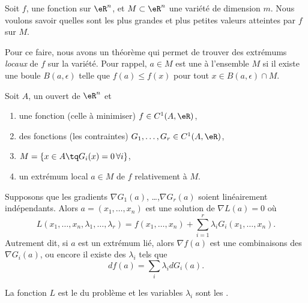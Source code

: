 Soit $f$, une fonction sur $\eR^n$, et $M\subset \eR^n$ une variété de dimension $m$. Nous voulons savoir quelles sont les plus grandes et plus petites valeurs atteintes par $f$ sur $M$.

Pour ce faire, nous avons un théorème qui permet de trouver des extrémums \emph{locaux} de $f$ sur la variété. Pour rappel, $a\in M$ est une  à l'ensemble $M$ si il existe une boule $B(a,\epsilon)$ telle que $f(a)\leq f(x)$ pour tout $x\in B(a,\epsilon)\cap M$.

\begin{theorem} \label{ThoRGJosS}
    Soit \( A\), un ouvert de \( \eR^n\) et
    \begin{enumerate}
        \item
            une fonction (celle à minimiser) $f\in C^1(A,\eR)$,
        \item
            des fonctions (les contraintes) $G_1,\ldots,G_r\in C^1(A,\eR)$,
        \item
            $M=\{ x\in A\tq G_i(x)=0\,\forall i\}$,
        \item
            un extrémum local $a\in M$ de $f$ relativement à $M$.
    \end{enumerate}
    Supposons que les gradients $\nabla G_1(a)$, \ldots,$\nabla G_r(a)$ soient linéairement indépendants. Alors $a=(x_1,\ldots,x_n)$ est une solution de \( \nabla L(a)=0\) où
    \begin{equation}
        L(x_1,\ldots,x_n,\lambda_1,\ldots,\lambda_r)=f(x_1,\ldots,x_n)+\sum_{i=1}^r\lambda_iG_i(x_1,\ldots,x_n).
    \end{equation}
    Autrement dit, si \( a\) est un extrémum lié, alors \( \nabla f(a)\) est une combinaisons des \( \nabla G_i(a)\), ou encore il existe des \( \lambda_i\) tels que
    \begin{equation}    \label{EqRDsSXyZ}
        df(a)=\sum_i\lambda_idG_i(a).
    \end{equation}
\end{theorem}
La fonction $L$ est le  du problème et les variables \( \lambda_i\) sont les .

